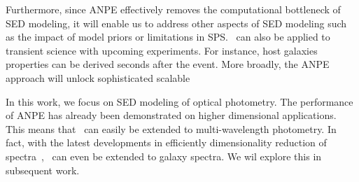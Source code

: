 Furthermore, since ANPE effectively removes the computational bottleneck of SED
modeling, it will enable us to address other aspects of SED modeling such as
the impact of model priors or limitations in SPS. 
\sedflow~can also be applied to transient science with upcoming experiments. 
For instance, host galaxies properties can be derived seconds after the event.
More broadly, the ANPE approach will unlock sophisticated  scalable 


In this work, we focus on SED modeling of optical photometry. 
The performance of ANPE has already been demonstrated on higher dimensional
applications. 
This means that \sedflow~can easily be extended to multi-wavelength photometry.
In fact, with the latest developments in efficiently dimensionality reduction
of spectra~\citep[][Melchior \& Hahn 2022]{portillo2020}, \sedflow~can even be
extended to galaxy spectra. 
We wil explore this in subsequent work. 
